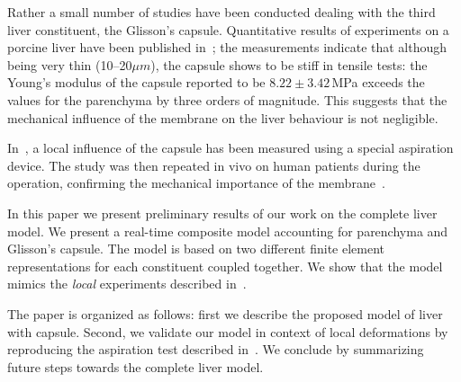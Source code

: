 \documentclass{acm_proc_article-sp}
\begin{document}
Rather a small number of studies have been conducted dealing with the third liver constituent, the  Glisson's capsule.
Quantitative results of experiments on a porcine liver have been published in~\cite{Umale2011}; the measurements indicate that although being very 
thin (10--20$\mu m$), the capsule shows to be stiff in tensile tests: the Young's modulus of the capsule reported to be $8.22\pm3.42$\,MPa 
exceeds the values for the parenchyma by three orders of magnitude.
This suggests that the mechanical influence of the membrane on the liver behaviour is not negligible.

In~\cite{Hollenstein2006}, a local influence of the capsule has been measured using a special aspiration device. The study was then repeated 
in vivo on human patients during the operation, confirming the mechanical importance of the membrane~\cite{Ahn2010,Nava2008}.

In this paper we present preliminary results of our work on the complete liver
model. We present a real-time composite model accounting for parenchyma and
Glisson's capsule. The model is based on two different finite element
representations for each constituent coupled together.
We show that the model mimics the \emph{local} experiments described in~\cite{Hollenstein2006}.
 

The paper is organized as follows: first we describe the proposed model of
liver with capsule. Second, we validate our model in context of local
deformations by reproducing the aspiration test described
in~\cite{Hollenstein2006}. We conclude by summarizing future steps towards the
complete liver model.
\end{document}
